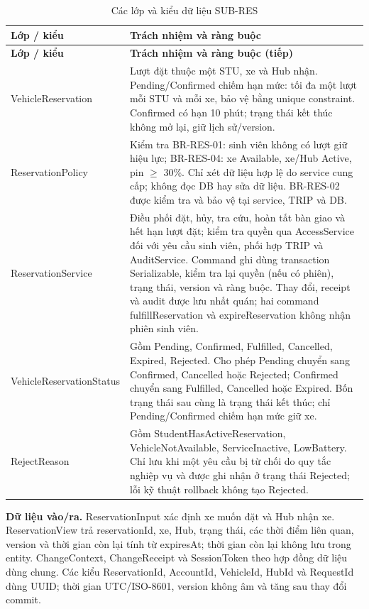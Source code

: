 \begin{longtable}{|L{37mm}|L{102mm}|}
\caption{Các lớp và kiểu dữ liệu SUB-RES}\\\hline
\textbf{Lớp / kiểu} & \textbf{Trách nhiệm và ràng buộc}\\\hline
\endfirsthead
\hline\textbf{Lớp / kiểu} & \textbf{Trách nhiệm và ràng buộc (tiếp)}\\\hline\endhead
Vehicle\allowbreak Reservation & Lượt đặt thuộc một STU, xe và Hub nhận. Pending/Confirmed chiếm hạn mức: tối đa một lượt mỗi STU và mỗi xe, bảo vệ bằng unique constraint. Confirmed có hạn 10 phút; trạng thái kết thúc không mở lại, giữ lịch sử/version.\\\hline
ReservationPolicy & Kiểm tra BR-RES-01: sinh viên không có lượt giữ hiệu lực; BR-RES-04:
xe Available, xe/Hub Active, pin $\geq$ 30\%.
Chỉ xét dữ liệu hợp lệ do service cung cấp; không đọc DB hay sửa dữ liệu.
BR-RES-02 được kiểm tra và bảo vệ tại service, TRIP và DB.\\\hline
Reservation\allowbreak Service & Điều phối đặt, hủy, tra cứu, hoàn tất bàn giao và hết hạn lượt đặt;
kiểm tra quyền qua AccessService đối với yêu cầu sinh viên,
phối hợp TRIP và AuditService. Command ghi dùng transaction
Serializable, kiểm tra lại quyền (nếu có phiên), trạng thái, version và ràng buộc. Thay đổi, receipt và audit được lưu nhất quán; hai command fulfill\allowbreak Reservation và
expireReservation không nhận phiên sinh viên.\\\hline
Vehicle\allowbreak Reservation\allowbreak Status & Gồm Pending, Confirmed, Fulfilled,
Cancelled, Expired, Rejected.
Cho phép Pending chuyển sang Confirmed,
Cancelled hoặc Rejected; Confirmed chuyển
sang Fulfilled, Cancelled hoặc Expired.
Bốn trạng thái sau cùng là trạng thái kết thúc; chỉ
Pending/Confirmed chiếm hạn mức giữ xe.\\\hline
RejectReason & Gồm Student\allowbreak Has\allowbreak Active\allowbreak Reservation,
Vehicle\allowbreak Not\allowbreak Available, ServiceInactive,
LowBattery. Chỉ lưu khi một yêu cầu bị từ chối do quy tắc
nghiệp vụ và được ghi nhận ở trạng thái Rejected; lỗi kỹ
thuật rollback không tạo Rejected.\\\hline
\end{longtable}

\textbf{Dữ liệu vào/ra.} ReservationInput xác định xe muốn đặt và Hub nhận xe. ReservationView trả reservationId, xe, Hub, trạng thái, các thời điểm liên quan, version và thời gian còn lại tính từ expiresAt; thời gian còn lại không lưu trong entity. ChangeContext, ChangeReceipt và SessionToken theo hợp đồng dữ liệu dùng chung. Các kiểu ReservationId, AccountId, VehicleId, HubId và RequestId dùng UUID; thời gian UTC/ISO-8601, version không âm và tăng sau thay đổi commit.

